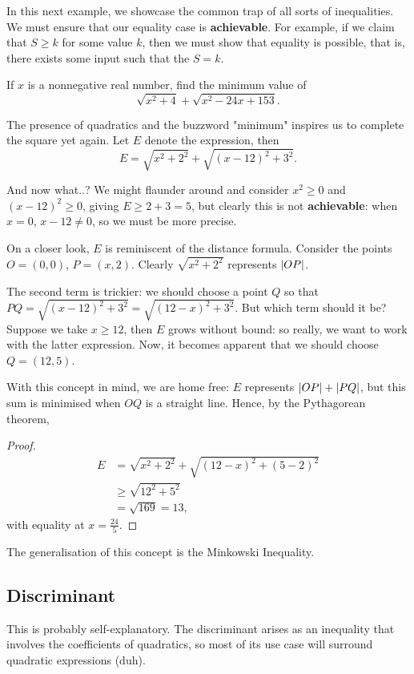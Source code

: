 \documentclass[../jarvis.tex]{subfiles}
\begin{document}
In this next example, we showcase the common trap of all sorts of inequalities. We must ensure that our equality case is \textbf{achievable}. For example, if we claim that $S\geq k$ for some value $k$, then we must show that equality is possible, that is, there exists some input such that the $S=k$.
\begin{example}[2019 SMO(J) P20]
    If $x$ is a nonnegative real number, find the minimum value of
    $$\sqrt{x^2+4}+\sqrt{x^2-24x+153}.$$
\end{example}
The presence of quadratics and the buzzword "minimum" inspires us to complete the square yet again. Let $E$ denote the expression, then
$$E=\sqrt{x^2+2^2}+\sqrt{(x-12)^2+3^2}.$$

And now what..? We might flaunder around and consider $x^2\geq 0$ and $(x-12)^2\geq 0$, giving $E\geq 2+3=5$, but clearly this is not \textbf{achievable}: when $x=0$, $x-12\neq 0$, so we must be more precise.

On a closer look, $E$ is reminiscent of the distance formula. Consider the points $O=(0,0)$, $P=(x,2)$. Clearly $\sqrt{x^2+2^2}$ represents $\left\lvert OP \right\rvert$. 

The second term is trickier: we should choose a point $Q$ so that $PQ=\sqrt{(x-12)^2+3^2}=\sqrt{(12-x)^2+3^2}$. But which term should it be? Suppose we take $x \geq 12$, then $E$ grows without bound: so really, we want to work with the latter expression. Now, it becomes apparent that we should choose $Q=(12,5)$.

With this concept in mind, we are home free: $E$ represents $\left\lvert OP \right\rvert+\left\lvert PQ \right\rvert$, but this sum is minimised when $OQ$ is a straight line. Hence, by the Pythagorean theorem,
\begin{proof}
    \begin{align*}
        E&=\sqrt{x^2+2^2}+\sqrt{(12-x)^2+(5-2)^2} \\
    &\geq\sqrt{12^2+5^2}\\
    &=\sqrt{169}=\boxed{13},
    \end{align*}
    with equality at $x=\frac{24}{5}$.
\end{proof}
\begin{remark}
    The generalisation of this concept is the Minkowski Inequality.
\end{remark}

\subsection{Discriminant}
This is probably self-explanatory. The discriminant arises as an inequality that involves the coefficients of quadratics, so most of its use case will surround quadratic expressions (duh).
\end{document}
